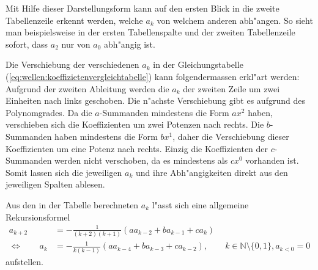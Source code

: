 Mit Hilfe dieser Darstellungsform kann auf den ersten Blick in die zweite 
Tabellenzeile erkennt werden, welche $a_k$ von welchem anderen abh"angen. So 
sieht man beispielsweise in der ersten Tabellenspalte und der zweiten 
Tabellenzeile sofort, dass $a_2$ nur von $a_0$ abh"angig ist.

Die Verschiebung der verschiedenen $a_k$ in der Gleichungstabelle 
(\ref{eq:wellen:koeffizietenvergleichtabelle}) kann folgendermassen erkl"art 
werden: Aufgrund der zweiten Ableitung werden die $a_k$ der zweiten Zeile um 
zwei Einheiten nach links geschoben. Die n"achste Verschiebung gibt es aufgrund 
des Polynomgrades. Da die $a$-Summanden mindestens die Form $ax^2$ haben, 
verschieben sich die Koeffizienten um zwei Potenzen nach rechts. Die 
$b$-Summanden haben mindestens die Form $bx^1$, daher die Verschiebung dieser 
Koeffizienten um eine Potenz nach rechts. Einzig die Koeffizienten der 
$c$-Summanden werden nicht verschoben, da es mindestens als $cx^0$ vorhanden 
ist. Somit lassen sich die jeweiligen $a_k$ und ihre Abh"angigkeiten direkt aus 
den jeweiligen Spalten ablesen.

Aus den in der Tabelle berechneten $a_k$ l"asst sich eine allgemeine 
Rekursionsformel
\begin{equation*}
	\begin{split}
		a_{k+2} &= -\frac{1}{(k+2)(k+1)} (aa_{k-2}+ba_{k-1}+ca_k) \\
		\Leftrightarrow \qquad
		a_k &= -\frac{1}{k(k-1)} (aa_{k-4}+ba_{k-3}+ca_{k-2}), \qquad k \in 
		\mathbb{N} \setminus \{0, 1\}, a_{k<0} = 0
	\end{split}
\end{equation*}
aufstellen.